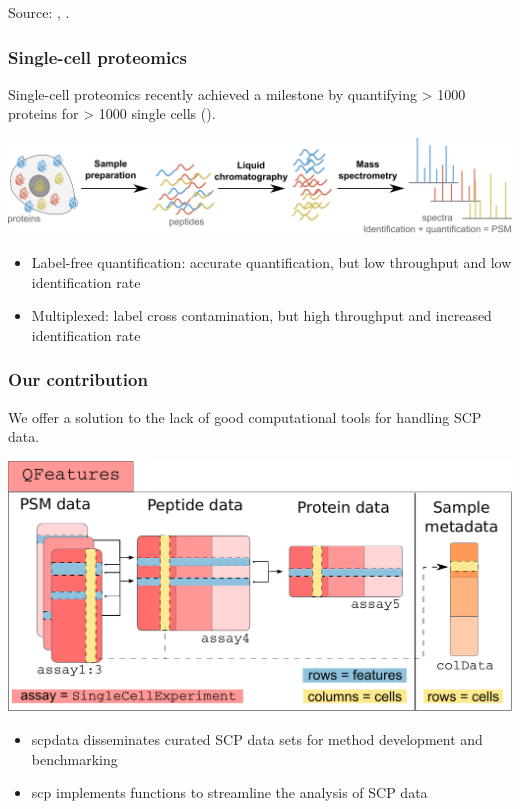 \documentclass{beamer}
\newcommand{\hcode}[2][lgray]{{\ttfamily\color{vdgray}\colorbox{#1}{#2}}}
\begin{document}
\begin{frame}[b]
\begin{columns}
  \end{columns}
  
  \vfill
  \footnotesize
  Source: \cite{Franks2017-lo}, \cite{Specht2020-jm}.
  
\end{frame}


\begin{frame}
  \frametitle{Single-cell proteomics}
  
  Single-cell proteomics recently achieved a milestone by quantifying 
  > 1000 proteins for > 1000 single cells 
  {\footnotesize(\cite{Specht2020-jm})}. 

  \vfill
  \includegraphics[width=\linewidth]{figs/MS-SCP.png}
  
  \vfill
  \begin{itemize}
    \item Label-free quantification: accurate quantification, but low 
      throughput and low identification rate
    \item Multiplexed: label cross contamination, but high throughput 
      and increased identification rate
  \end{itemize}

\end{frame}

\begin{frame}
  \frametitle{Our contribution}
  
  We offer a solution to the lack of good computational tools for 
  handling SCP data.

  \vfill
  \includegraphics[width=0.8\linewidth]{figs/SCP_framework.pdf}
  
  \vfill
  \begin{itemize}
    \item \hcode{scpdata} disseminates curated SCP data sets 
    for method development and benchmarking
    \item \hcode{scp} implements functions to streamline the 
    analysis of SCP data
  \end{itemize}

\end{frame}
\end{document}

